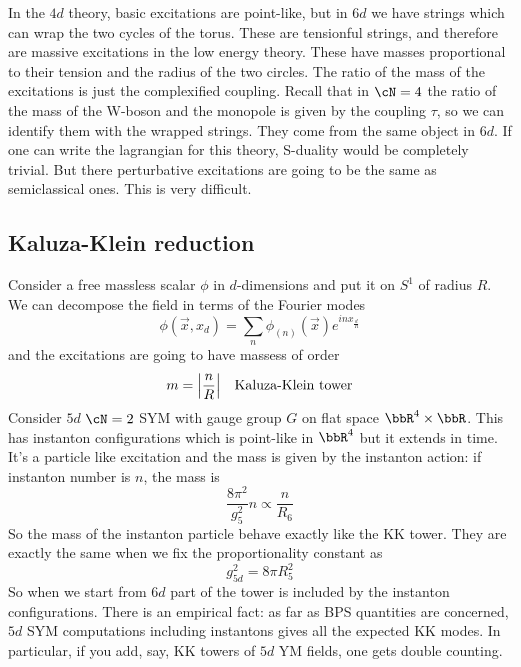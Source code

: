 In the $4d$ theory, basic excitations are point-like, but in $6d$ we have strings which can wrap the two cycles of the torus. These are tensionful strings, and therefore are massive excitations in the low energy theory. These have masses proportional to their tension and the radius of the two circles. The ratio of the mass of the excitations is just the complexified coupling. Recall that in $\cN=4$ the ratio of the mass of the W-boson and the monopole is given by the coupling $\tau$, so we can identify them with the wrapped strings. They come from the same object in $6d$. If one can write the lagrangian for this theory, S-duality would be completely trivial. But there perturbative excitations are going to be the same as semiclassical ones. This is very difficult.

\subsection{Kaluza-Klein reduction}
Consider a free massless scalar $\phi$ in $d$-dimensions and put it on $S^1$ of radius $R$. We can decompose the field in terms of the Fourier modes
\begin{equation}
	\phi(\vec{x},x_d)=\sum_n\phi_{(n)}(\vec{x})e^{in x_\frac{d}{R}}
\end{equation}
and the excitations are going to have massess of order 
\begin{equation}
	m=\abs{\frac{n}{R}}\quad\text{Kaluza-Klein tower}
\end{equation}
Consider $5d$ $\cN=2$ SYM with gauge group $G$ on flat space $\bbR^4\times \bbR$. This has instanton configurations which is point-like in $\bbR^4$ but it extends in time. It's a particle like excitation and the mass is given by the instanton action: if instanton number is $n$, the mass is 
\begin{equation}
	\frac{8\pi^2}{g_5^2}n\propto \frac{n}{R_6}
\end{equation}
So the mass of the instanton particle behave exactly like the KK tower. They are exactly the same when we fix the proportionality constant as
\begin{equation}
	g_{5d}^2=8\pi R_5^2
\end{equation}
So when we start from $6d$ part of the tower is included by the instanton configurations. There is an empirical fact: as far as BPS quantities are concerned, $5d$ SYM computations including instantons gives all the expected KK modes. In particular, if you add, say, KK towers of $5d$ YM fields, one gets double counting.

